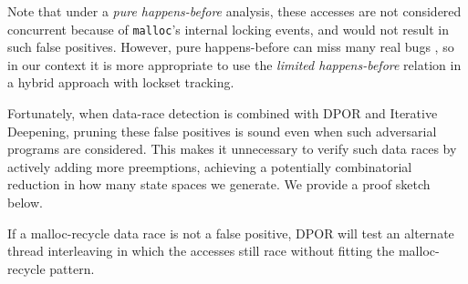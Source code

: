 Note that under a {\em pure happens-before} analysis,
these accesses are not considered concurrent %
because of {\tt malloc}'s internal locking events,
and would not result in such false positives.
However, pure happens-before can miss many real bugs \cite{hybriddatarace,tsan},
so in our context it is more appropriate to use the
{\em limited happens-before} relation in a hybrid approach with lockset tracking.

Fortunately, when data-race detection is combined with DPOR and Iterative Deepening, pruning these false positives is sound even when such adversarial programs are considered.
This makes it unnecessary to verify such data races by actively adding more preemptions,
achieving a potentially combinatorial reduction in how many state spaces we generate.
We provide a proof sketch below.

\renewcommand\proofname{Proof Sketch}

\begin{theorem}
If a malloc-recycle data race is not a false positive,
DPOR will test an alternate thread interleaving in which
the accesses still race without fitting the malloc-recycle pattern.
\end{theorem}

